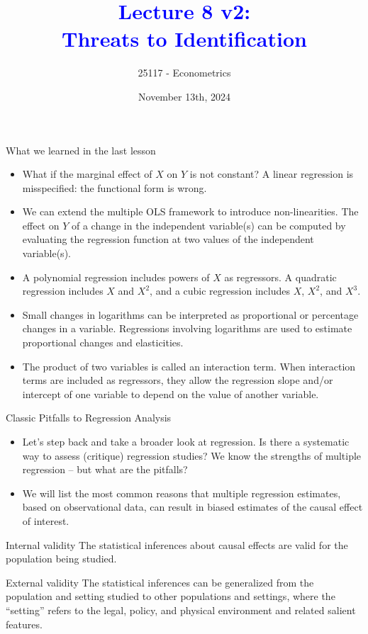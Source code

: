 \documentclass[notes,10pt, aspectratio=169]{beamer}
\title[]{\textcolor{blue}{Lecture 8 v2:\\Threats to Identification}}
\author{25117 - Econometrics}
\institute[shortinst]{Universitat Pompeu Fabra}
\date{November 13th, 2024}
\begin{document}
\begin{frame}[plain]
\maketitle
\end{frame}



\begin{frame}{What we learned in the last lesson}
\begin{itemize}
    \item What if the marginal effect of $X$ on $Y$ is not constant? A linear regression is misspecified: the functional form is wrong.\\
    \item We can extend the multiple OLS framework to introduce non-linearities. The effect on $Y$ of a change in the independent variable(s) can be computed by evaluating the regression function at two values of the independent variable(s).\\
    \item A polynomial regression includes powers of $X$ as regressors. A quadratic regression includes $X$ and $X^2$, and a cubic regression includes $X$, $X^2$, and $X^3$.
    \item Small changes in logarithms can be interpreted as proportional or percentage changes in a variable. Regressions involving logarithms are used to estimate proportional changes and elasticities.
    \item The product of two variables is called an interaction term. When interaction terms are included as regressors, they allow the regression slope and/or intercept of one variable to depend on the value of another variable.
\end{itemize}
\end{frame}

\begin{frame}{Classic Pitfalls to Regression Analysis}
\begin{itemize}
    \item Let’s step back and take a broader look at regression. Is there a systematic way to assess (critique) regression studies? We know the strengths of multiple regression – but what are the pitfalls?\\[1em]
    \item We will list the most common reasons that multiple regression estimates, based on observational data, can result in biased estimates of the causal effect of interest.
\end{itemize}
\begin{exampleblock}{Internal validity}
The statistical inferences about causal effects are valid for the population being studied.
\end{exampleblock}
\begin{exampleblock}{External validity}
The statistical inferences can be generalized from the population and setting studied to other populations and settings, where the ``setting'' refers to the legal, policy, and physical environment and related salient features.
\end{exampleblock}

\end{frame}
\end{document}
